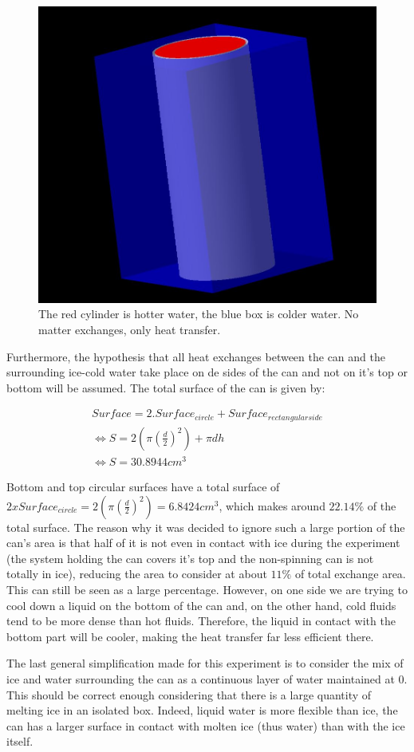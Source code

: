 \documentclass{report}
\begin{document}
	\begin{figure}
		\centering
		\includegraphics[width=.5\textwidth]{img/cyl.jpg}
		\caption{The red cylinder is hotter water, the blue box is colder water. No matter exchanges, only heat transfer.}
		\label{cyl}
	\end{figure}
	
	Furthermore, the hypothesis that all heat exchanges between the can and the surrounding ice-cold water take place on de sides of the can and not on it's top or bottom will be assumed. The total surface of the can is given by:
	
	\begin{equation}
		\begin{gathered}
			Surface= 2.Surface_{circle} + Surface_{rectangular side} \\
			\Leftrightarrow S= 2 (\pi  (\frac{d}{2})^2) + \pi dh \\
			\Leftrightarrow S= 30.8944 cm^3
		\end{gathered}
	\end{equation}
	
	Bottom and top circular surfaces have a total surface of $2xSurface_{circle}=2 (\pi  (\frac{d}{2})^2)= 6.8424 cm^3$, which makes around $22.14\% $ of the total surface. The reason why it was decided to ignore such a large portion of the can's area is that half of it is not even in contact with ice during the experiment (the system holding the can covers it's top and the non-spinning can is not totally in ice), reducing the area to consider at about $11\% $ of total exchange area. This can still be seen as a large percentage. However, on one side we are trying to cool down a liquid on the bottom of the can and, on the other hand, cold fluids tend to be more dense than hot fluids. Therefore, the liquid in contact with the bottom part will be cooler, making the heat transfer far less efficient there.
	
	The last general simplification made for this experiment is to consider the mix of ice and water surrounding the can as a continuous layer of water maintained at 0\textcelsius. This should be correct enough considering that there is a large quantity of melting ice in an isolated box. Indeed, liquid water is more flexible than ice, the can has a larger surface in contact with molten ice (thus water) than with the ice itself.
	
\end{document}
